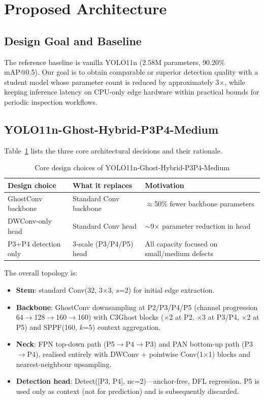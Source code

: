 \documentclass[11pt,a4paper]{article}
\begin{document}
\section{Proposed Architecture}
\label{sec:arch}

\subsection{Design Goal and Baseline}

The reference baseline is vanilla YOLO11n (2.58M parameters, 90.20\% mAP@0.5). Our goal
is to obtain comparable or superior detection quality with a student model whose parameter
count is reduced by approximately 3$\times$, while keeping inference latency on CPU-only
edge hardware within practical bounds for periodic inspection workflows.

\subsection{YOLO11n-Ghost-Hybrid-P3P4-Medium}

Table~\ref{tab:design_choices} lists the three core architectural decisions and their
rationale.

\begin{table}[H]
\centering
\caption{Core design choices of YOLO11n-Ghost-Hybrid-P3P4-Medium}
\label{tab:design_choices}
\begin{tabular}{lll}
\toprule
\textbf{Design choice} & \textbf{What it replaces} & \textbf{Motivation} \\
\midrule
GhostConv backbone    & Standard Conv backbone      & $\approx$50\% fewer backbone parameters \\
DWConv-only head      & Standard Conv head          & $\sim$9$\times$ parameter reduction in head \\
P3+P4 detection only  & 3-scale (P3/P4/P5) head     & All capacity focused on small/medium defects \\
\bottomrule
\end{tabular}
\end{table}

The overall topology is:
\begin{itemize}[leftmargin=2em]
  \item \textbf{Stem}: standard Conv(32, 3$\times$3, $s$=2) for initial edge extraction.
  \item \textbf{Backbone}: GhostConv downsampling at P2/P3/P4/P5 (channel progression
    64$\to$128$\to$160$\to$160) with C3Ghost blocks ($\times$2 at P2, $\times$3 at
    P3/P4, $\times$2 at P5) and SPPF(160, $k$=5) context aggregation.
  \item \textbf{Neck}: FPN top-down path (P5$\to$P4$\to$P3) and PAN bottom-up path
    (P3$\to$P4), realised entirely with DWConv + pointwise Conv(1$\times$1) blocks and
    nearest-neighbour upsampling.
  \item \textbf{Detection head}: Detect([P3, P4], nc=2)---anchor-free, DFL regression.
    P5 is used only as context (not for prediction) and is subsequently discarded.
\end{itemize}
\end{document}

